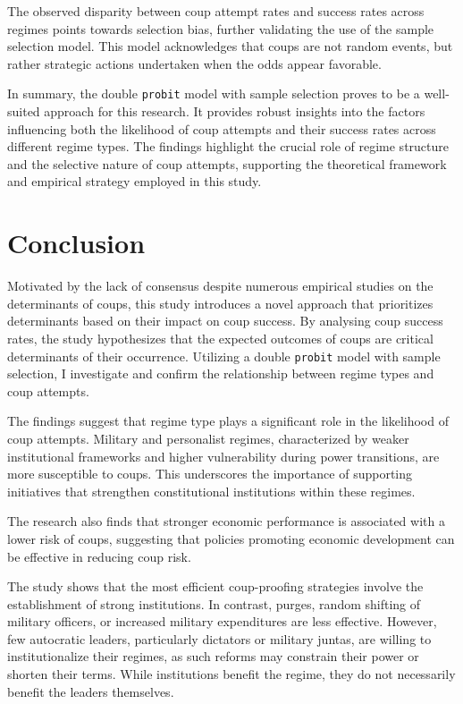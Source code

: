 \documentclass[
  12pt,
]{report}
\begin{document}
The observed disparity between coup attempt rates and success rates
across regimes points towards selection bias, further validating the use
of the sample selection model. This model acknowledges that coups are
not random events, but rather strategic actions undertaken when the odds
appear favorable.

In summary, the double \texttt{probit} model with sample selection
proves to be a well-suited approach for this research. It provides
robust insights into the factors influencing both the likelihood of coup
attempts and their success rates across different regime types. The
findings highlight the crucial role of regime structure and the
selective nature of coup attempts, supporting the theoretical framework
and empirical strategy employed in this study.

\section{Conclusion}\label{conclusion}

Motivated by the lack of consensus despite numerous empirical studies on
the determinants of coups, this study introduces a novel approach that
prioritizes determinants based on their impact on coup success. By
analysing coup success rates, the study hypothesizes that the expected
outcomes of coups are critical determinants of their occurrence.
Utilizing a double \texttt{probit} model with sample selection, I
investigate and confirm the relationship between regime types and coup
attempts.

The findings suggest that regime type plays a significant role in the
likelihood of coup attempts. Military and personalist regimes,
characterized by weaker institutional frameworks and higher
vulnerability during power transitions, are more susceptible to coups.
This underscores the importance of supporting initiatives that
strengthen constitutional institutions within these regimes.

The research also finds that stronger economic performance is associated
with a lower risk of coups, suggesting that policies promoting economic
development can be effective in reducing coup risk.

The study shows that the most efficient coup-proofing strategies involve
the establishment of strong institutions. In contrast, purges, random
shifting of military officers, or increased military expenditures are
less effective. However, few autocratic leaders, particularly dictators
or military juntas, are willing to institutionalize their regimes, as
such reforms may constrain their power or shorten their terms. While
institutions benefit the regime, they do not necessarily benefit the
leaders themselves.
\end{document}
